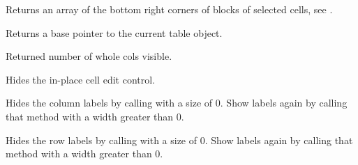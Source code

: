 \label{wxgridgetselectionblockbottomright}


Returns an array of the bottom right corners of blocks of selected cells,
see .



\label{wxgridgetselectionforeground}




\label{wxgridgettable}


Returns a base pointer to the current table object.



\label{wxgridgetviewwidth}


Returned number of whole cols visible.



\label{wxgridhidecelleditcontrol}


Hides the in-place cell edit control.


\label{wxgridhidecollabels}


Hides the column labels by calling 
with a size of 0. Show labels again by calling that method with
a width greater than 0.


\label{wxgridhiderowlabels}


Hides the row labels by calling 
with a size of 0. Show labels again by calling that method with
a width greater than 0.


\label{wxgridinitcolwidths}


